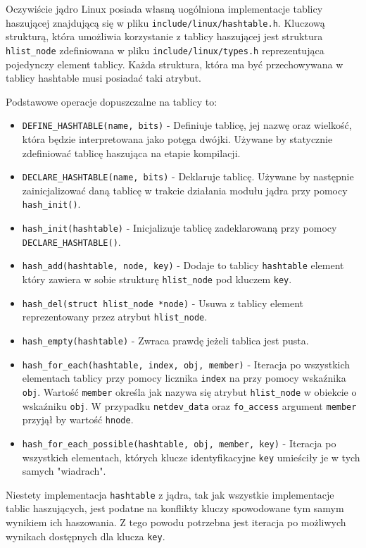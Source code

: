 \documentclass[10pt]{article}
\begin{document}
Oczywiście jądro Linux posiada własną uogólniona implementacje tablicy haszującej znajdującą się w pliku \texttt{include/linux/hashtable.h}.  Kluczową strukturą, która umożliwia korzystanie z tablicy haszującej jest struktura \texttt{hlist\_node} zdefiniowana w pliku \texttt{include/linux/types.h} reprezentująca pojedynczy element tablicy. Każda struktura, która ma być przechowywana w tablicy hashtable musi posiadać taki atrybut.

Podstawowe operacje dopuszczalne na tablicy to:

\begin{itemize}
\itemsep1pt\parskip0pt
\item
  \texttt{DEFINE\_HASHTABLE(name, bits)} - Definiuje tablicę, jej nazwę oraz wielkość, która będzie interpretowana jako potęga dwójki. Używane by statycznie zdefiniować tablicę haszująca na etapie kompilacji.
\item
  \texttt{DECLARE\_HASHTABLE(name, bits)} - Deklaruje tablicę. Używane by następnie zainicjalizować daną tablicę w trakcie działania modułu jądra przy pomocy \texttt{hash\_init()}.
\item
  \texttt{hash\_init(hashtable)} - Inicjalizuje tablicę zadeklarowaną przy pomocy \texttt{DECLARE\_HASHTABLE()}.
\item
  \texttt{hash\_add(hashtable, node, key)} - Dodaje to tablicy \texttt{hashtable} element który zawiera w sobie strukturę \texttt{hlist\_node} pod kluczem \texttt{key}.
\item
  \texttt{hash\_del(struct hlist\_node *node)} - Usuwa z tablicy element reprezentowany przez atrybut \texttt{hlist\_node}.
\item
  \texttt{hash\_empty(hashtable)} - Zwraca prawdę jeżeli tablica jest pusta.
\item
  \texttt{hash\_for\_each(hashtable, index, obj, member)} - Iteracja po wszystkich elementach tablicy przy pomocy licznika \texttt{index} na przy pomocy wskaźnika \texttt{obj}. Wartość \texttt{member} określa jak nazywa się atrybut \texttt{hlist\_node} w obiekcie o wskaźniku \texttt{obj}. W przypadku \texttt{netdev\_data} oraz \texttt{fo\_access} argument \texttt{member} przyjął by wartość \texttt{hnode}.
\item
  \texttt{hash\_for\_each\_possible(hashtable, obj, member, key)} - Iteracja po wszystkich elementach, których klucze identyfikacyjne \texttt{key} umieściły je w tych samych "wiadrach".
\end{itemize}

Niestety implementacja \texttt{hashtable} z jądra, tak jak wszystkie implementacje tablic haszujących, jest podatne na konflikty kluczy spowodowane tym samym wynikiem ich haszowania. Z tego powodu potrzebna jest iteracja po możliwych wynikach dostępnych dla klucza \texttt{key}.
\end{document}
